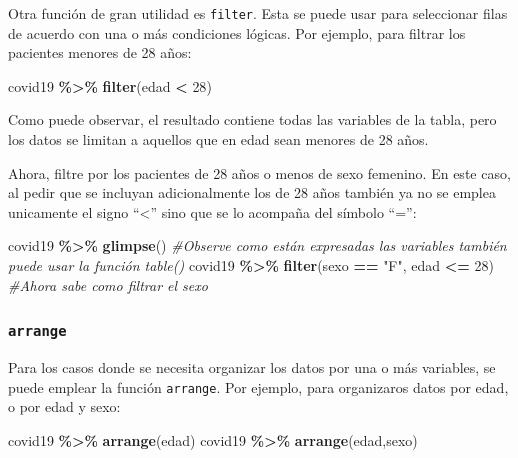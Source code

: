 \documentclass[
]{article}
\newenvironment{Shaded}{\begin{snugshade}}{\end{snugshade}}
\newcommand{\CommentTok}[1]{\textcolor[rgb]{0.56,0.35,0.01}{\textit{#1}}}
\newcommand{\DecValTok}[1]{\textcolor[rgb]{0.00,0.00,0.81}{#1}}
\newcommand{\FunctionTok}[1]{\textcolor[rgb]{0.13,0.29,0.53}{\textbf{#1}}}
\newcommand{\NormalTok}[1]{#1}
\newcommand{\SpecialCharTok}[1]{\textcolor[rgb]{0.81,0.36,0.00}{\textbf{#1}}}
\newcommand{\StringTok}[1]{\textcolor[rgb]{0.31,0.60,0.02}{#1}}
\begin{document}
Otra función de gran utilidad es \texttt{filter}. Esta se puede usar
para seleccionar filas de acuerdo con una o más condiciones lógicas. Por
ejemplo, para filtrar los pacientes menores de 28 años:

\begin{Shaded}
\begin{Highlighting}[]
\NormalTok{covid19 }\SpecialCharTok{\%\textgreater{}\%} \FunctionTok{filter}\NormalTok{(edad }\SpecialCharTok{\textless{}} \DecValTok{28}\NormalTok{)}
\end{Highlighting}
\end{Shaded}

Como puede observar, el resultado contiene todas las variables de la
tabla, pero los datos se limitan a aquellos que en edad sean menores de
28 años.

Ahora, filtre por los pacientes de 28 años o menos de sexo femenino. En
este caso, al pedir que se incluyan adicionalmente los de 28 años
también ya no se emplea unicamente el signo ``\textless{}'' sino que se
lo acompaña del símbolo ``='':

\begin{Shaded}
\begin{Highlighting}[]
\NormalTok{covid19 }\SpecialCharTok{\%\textgreater{}\%} \FunctionTok{glimpse}\NormalTok{() }\CommentTok{\#Observe como están expresadas las variables también puede usar la función \textasciigrave{}table()\textasciigrave{}}
\NormalTok{covid19 }\SpecialCharTok{\%\textgreater{}\%} \FunctionTok{filter}\NormalTok{(sexo }\SpecialCharTok{==} \StringTok{"F"}\NormalTok{, edad }\SpecialCharTok{\textless{}=} \DecValTok{28}\NormalTok{) }\CommentTok{\#Ahora sabe como filtrar el sexo}
\end{Highlighting}
\end{Shaded}

\subsubsection{\texorpdfstring{\texttt{arrange}}{arrange}}\label{arrange}

Para los casos donde se necesita organizar los datos por una o más
variables, se puede emplear la función \texttt{arrange}. Por ejemplo,
para organizaros datos por edad, o por edad y sexo:

\begin{Shaded}
\begin{Highlighting}[]
\NormalTok{covid19 }\SpecialCharTok{\%\textgreater{}\%} \FunctionTok{arrange}\NormalTok{(edad)}
\NormalTok{covid19 }\SpecialCharTok{\%\textgreater{}\%} \FunctionTok{arrange}\NormalTok{(edad,sexo)}
\end{Highlighting}
\end{Shaded}
\end{document}
